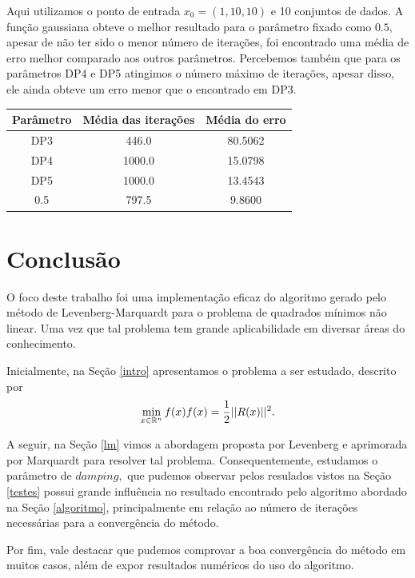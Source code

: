 \documentclass[12pt,a4paper]{article}
\newcounter{ex}[section]
\begin{document}
	
	Aqui utilizamos o ponto de entrada $x_0 = (1, 10, 10)$ e 10 conjuntos de dados. A função gaussiana obteve o melhor resultado para o parâmetro fixado como $0.5,$ apesar de não ter sido o menor número de iterações, foi encontrado uma média de erro melhor comparado aos outros parâmetros. Percebemos também que para os parâmetros DP4 e DP5 atingimos o número máximo de iterações, apesar disso, ele ainda obteve um erro menor que o encontrado em DP3.
	
	\begin{table}[H]
		\centering
		\begin{tabular}{|c|c|c|}
			\hline
			Parâmetro & Média das iterações & Média do erro\\
			\hline
			
			DP3 & 446.0 & 80.5062\\ \hline
			DP4 & 1000.0 & 15.0798\\ \hline
			DP5 & 1000.0 & 13.4543\\ \hline
			0.5 & 797.5 & 9.8600\\		\hline	
			
		\end{tabular}
	\end{table}

	
	\section{Conclusão}
	
	O foco deste trabalho foi uma implementação eficaz do algoritmo gerado pelo método de Levenberg-Marquardt para o problema de quadrados mínimos não linear. Uma vez que tal problema tem grande aplicabilidade em diversar áreas do conhecimento. 
	
	Inicialmente, na Seção \ref{intro} apresentamos o problema a ser estudado, descrito por 
	\begin{equation*}
	\min_{x \in \mathbb{R}^{n}} f(x) 
	\\	
	f(x) = \frac{1}{2}||R(x)||^2.
	\end{equation*}
	
	A seguir, na Seção \ref{lm} vimos a abordagem proposta por Levenberg e aprimorada por Marquardt para resolver tal problema. Consequentemente, estudamos o parâmetro de $damping,$ que pudemos observar pelos resulados vistos na Seção \ref{testes} possui grande influência no resultado encontrado pelo algoritmo abordado na Seção \ref{algoritmo}, principalmente em relação ao número de iterações necessárias para a convergência do método.
	
	Por fim, vale destacar que pudemos comprovar a boa convergência do método em muitos casos, além de expor resultados numéricos do uso do algoritmo.
	
	
	\nocite{aes}
	\nocite{friedlander1994elementos}
	\nocite{kab}
	
	
	
\end{document}
